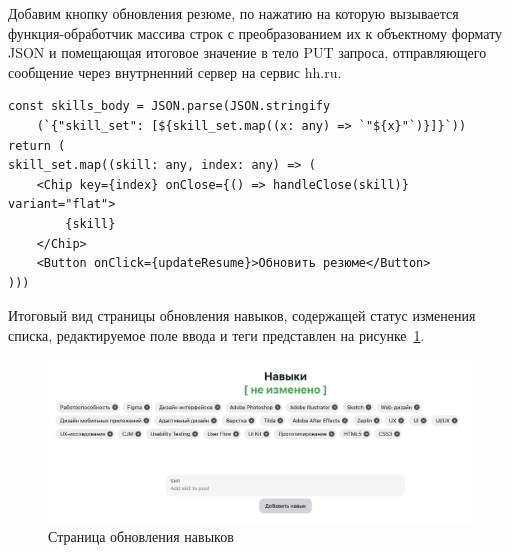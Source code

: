 \documentclass[master, och, diploma]{SCWorks}
\begin{document}
Добавим кнопку обновления резюме, по нажатию на которую вызывается функция-обработчик массива строк с преобразованием их к объектному формату JSON и помещающая итоговое значение в тело PUT запроса, отправляющего сообщение через внутрненний сервер на сервис hh.ru.
\begin{verbatim}
const skills_body = JSON.parse(JSON.stringify
    (`{"skill_set": [${skill_set.map((x: any) => `"${x}"`)}]}`))
return (
skill_set.map((skill: any, index: any) => (
    <Chip key={index} onClose={() => handleClose(skill)} variant="flat">
        {skill}
    </Chip>
    <Button onClick={updateResume}>Обновить резюме</Button>
)))
\end{verbatim}

Итоговый вид страницы обновления навыков, содержащей статус изменения списка, редактируемое поле ввода и теги представлен на рисунке~\ref{fig:29}. 
\begin{figure}[!ht]
    \centering
    \includegraphics[width=12cm]{images/image-update-skills.png}
    \caption{\label{fig:29}%
        Страница обновления навыков}
\end{figure}
\end{document}
